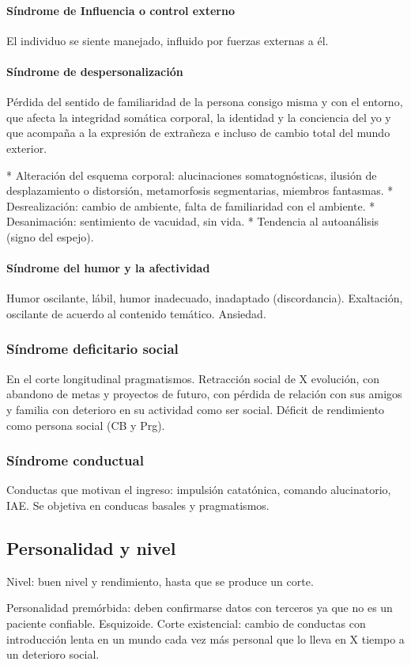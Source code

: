 \documentclass{scrbook}
\begin{document}
\paragraph{Síndrome de Influencia o control externo}
El individuo se siente manejado, influido por fuerzas externas a él.
\paragraph{Síndrome de despersonalización}
Pérdida del sentido de familiaridad de la persona consigo misma y con el entorno, que afecta la integridad somática corporal, la identidad y la conciencia del yo y que acompaña a la expresión de extrañeza e incluso de cambio total del mundo exterior.

* Alteración del esquema corporal: alucinaciones somatognósticas, ilusión de desplazamiento o distorsión, metamorfosis segmentarias, miembros fantasmas.
* Desrealización: cambio de ambiente, falta de familiaridad con el ambiente.
* Desanimación: sentimiento de vacuidad, sin vida.
* Tendencia al autoanálisis (signo del espejo).
\paragraph{Síndrome del humor y la afectividad}
Humor oscilante, lábil, humor inadecuado, inadaptado (discordancia). Exaltación, oscilante de acuerdo al contenido temático. Ansiedad.
\subsubsection*{Síndrome deficitario social}
En el corte longitudinal pragmatismos. Retracción social de X evolución, con abandono de metas y proyectos de futuro, con pérdida de relación con sus amigos y familia con deterioro en su actividad como ser social. Déficit de rendimiento como persona social (CB y Prg).
\subsubsection*{Síndrome conductual}
Conductas que motivan el ingreso: impulsión catatónica, comando alucinatorio, IAE. Se objetiva en conducas basales y pragmatismos.
\subsection*{Personalidad y nivel}
Nivel: buen nivel y rendimiento, hasta que se produce un corte.

Personalidad premórbida: deben confirmarse datos con terceros ya que no es un paciente confiable. Esquizoide. Corte existencial: cambio de conductas con introducción lenta en un mundo cada vez más personal que lo lleva en X tiempo a un deterioro social.
\end{document}
